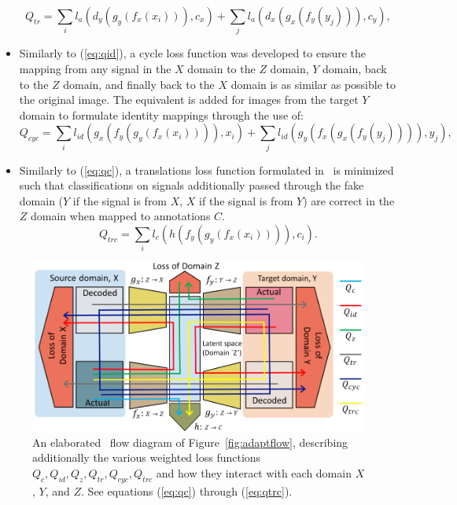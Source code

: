 \begin{itemize}
\begin{equation}
\label{eq:qtr}
Q_{tr} = \sum_i l_a(d_y(g_y(f_x(x_i))),c_x)+\sum_j l_a(d_x(g_x(f_y(y_j))),c_y),
\end{equation}
\item Similarly to (\ref{eq:qid}), a cycle loss function\cite{dadaptcyc} was developed to ensure the mapping from any signal in the $X$ domain to the $Z$ domain, $Y$ domain, back to the $Z$ domain, and finally back to the $X$ domain is as similar as possible to the original image. The equivalent is added for images from the target $Y$ domain to formulate identity mappings through the use of:
\begin{equation}
\label{eq:qcyc}
Q_{cyc} = \sum_i l_{id}(g_x(f_y(g_y(f_x(x_i)))),x_i)+\sum_j l_{id}(g_y(f_x(g_x(f_y(y_j)))),y_j),
\end{equation}
\item Similarly to (\ref{eq:qc}), a translations loss function formulated in~\cite{dadaptHRL} is minimized such that classifications on signals additionally passed through the fake domain ($Y$ if the signal is from $X$, $X$ if the signal is from $Y$) are correct in the $Z$ domain when mapped to annotations $C$.
\begin{equation}
\label{eq:qtrc}
Q_{trc} = \sum_i l_c(h(f_y(g_y(f_x(x_i)))),c_i).
\end{equation}
\end{itemize}

\begin{figure}[ht!]
	\centering	\includegraphics[width=1\textwidth,keepaspectratio]{figs/domainadapt.png}
    \caption{An elaborated~\cite{dadaptHRL} flow diagram of Figure~\ref{fig:adaptflow}, describing additionally the various weighted loss functions $Q_c, Q_{id}, Q_z, Q_{tr}, Q_{cyc}, Q_{trc}$ and how they interact with each domain $X$, $Y$, and $Z$. See equations (\ref{eq:qc}) through (\ref{eq:qtrc}).}
\label{fig:adapt}      
\end{figure}

